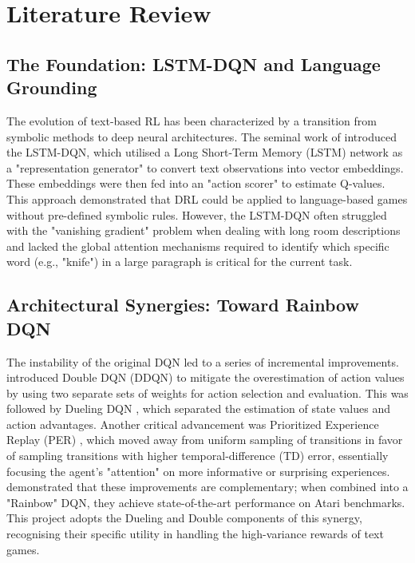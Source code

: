 \documentclass[11pt,a4paper]{article}
\begin{document}
\section{Literature Review}

\subsection{The Foundation: LSTM-DQN and Language Grounding}
The evolution of text-based RL has been characterized by a transition from symbolic methods to deep neural architectures. The seminal work of \citet{narasimhan2015language} introduced the LSTM-DQN, which utilised a Long Short-Term Memory (LSTM) network as a "representation generator" to convert text observations into vector embeddings. These embeddings were then fed into an "action scorer" to estimate Q-values. This approach demonstrated that DRL could be applied to language-based games without pre-defined symbolic rules. However, the LSTM-DQN often struggled with the "vanishing gradient" problem when dealing with long room descriptions and lacked the global attention mechanisms required to identify which specific word (e.g., "knife") in a large paragraph is critical for the current task.

\subsection{Architectural Synergies: Toward Rainbow DQN}
The instability of the original DQN led to a series of incremental improvements. \citet{van2016deep} introduced Double DQN (DDQN) to mitigate the overestimation of action values by using two separate sets of weights for action selection and evaluation. This was followed by Dueling DQN \citep{wang2016dueling}, which separated the estimation of state values and action advantages. Another critical advancement was Prioritized Experience Replay (PER) \citep{schaul2015prioritized}, which moved away from uniform sampling of transitions in favor of sampling transitions with higher temporal-difference (TD) error, essentially focusing the agent's "attention" on more informative or surprising experiences. \citet{hessel2018rainbow} demonstrated that these improvements are complementary; when combined into a "Rainbow" DQN, they achieve state-of-the-art performance on Atari benchmarks. This project adopts the Dueling and Double components of this synergy, recognising their specific utility in handling the high-variance rewards of text games.
\end{document}
